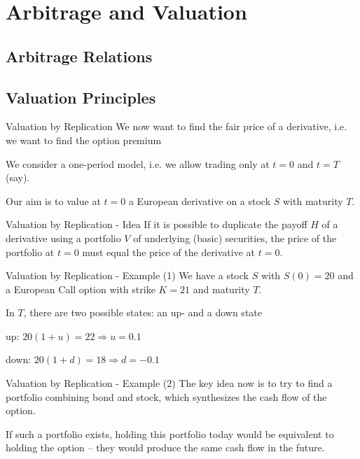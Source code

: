 \section{Arbitrage and Valuation}

	\begin{center}
	\end{center}

\subsection{Arbitrage Relations}
\subsection{Valuation Principles}


Valuation by Replication
	We now want to find the fair price of a derivative, i.e. we want to find the option premium

  We consider a one-period model, i.e. we allow trading only at $t=0$ and $t=T$(say).
   
	Our aim is to value at $t=0$  a European derivative on a stock $S$ with maturity $T$.


Valuation by Replication - Idea
	If it is possible to duplicate the payoff $H$ of a derivative
	using a portfolio $V$ of underlying (basic) securities, the price of the
	portfolio at $t=0$ must equal the price of the derivative at $t=0$.


Valuation by Replication - Example (1)
	We have a stock $S$ with $S(0)=20$ and a European Call option with strike $K=21$ and maturity $T$.
  
	In $T$, there are two possible states: an up- and a down state

	
	up: $20 (1+u)=22 \Rightarrow u=0.1$
  
	down: $20 (1+d)=18 \Rightarrow d=-0.1$


Valuation by Replication - Example (2)
	The key idea now is to try to find a portfolio combining bond and
	stock, which synthesizes the cash flow of the option.

	If such a portfolio exists, holding this portfolio today would be equivalent
	to holding the option -- they would produce the same cash flow in
	the future.

